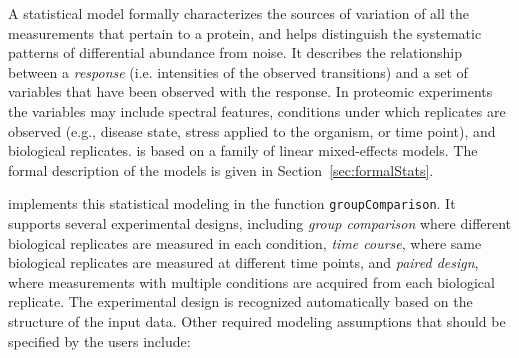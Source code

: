 \documentclass[11pt]{article}
\def\secref#1{Section~\ref{sec:#1}}
\begin{document}
A statistical model formally characterizes the sources of variation of all the measurements that pertain to a protein, and helps distinguish the systematic patterns of differential abundance from noise.  It describes the relationship between a {\it response} (i.e. intensities of the observed transitions) and a set of variables that have been observed with the response. In proteomic experiments the variables may include spectral features, conditions under which replicates are observed (e.g., disease state, stress applied to the organism, or time point), and biological replicates. \m is based on a family of linear mixed-effects models. The formal description of the models is given in \secref{formalStats}.  

\m implements this statistical modeling in the function {\tt groupComparison}. It supports several experimental designs, including {\it group comparison} where different biological replicates are measured in each condition, {\it time course}, where same biological replicates are measured at different time points, and {\it paired design}, where measurements with multiple conditions are acquired from each biological replicate. The experimental design is recognized automatically based on the structure of the input data. Other required modeling assumptions that should be specified by the users include:
\end{document}
